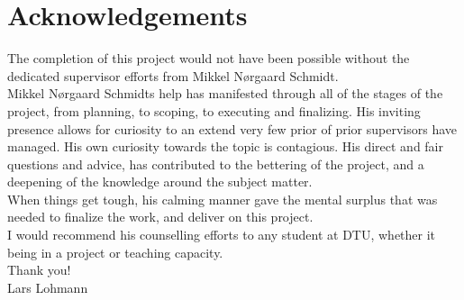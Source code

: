 \newpage
\section{Acknowledgements}
The completion of this project would not have been possible without the dedicated supervisor efforts from Mikkel Nørgaard Schmidt.\\

Mikkel Nørgaard Schmidts help has manifested through all of the stages of the project, from planning, to scoping, to executing and finalizing. His inviting presence allows for curiosity to an extend very few prior of prior supervisors have managed. His own curiosity towards the topic is contagious. His direct and fair questions and advice, has contributed to the bettering of the project, and a deepening of the knowledge around the subject matter. \\

When things get tough, his calming manner gave the mental surplus that was needed to finalize the work, and deliver on this project. \\

I would recommend his counselling efforts to any student at DTU, whether it being in a project or teaching capacity.\\

Thank you!\\

Lars Lohmann
\newpage
